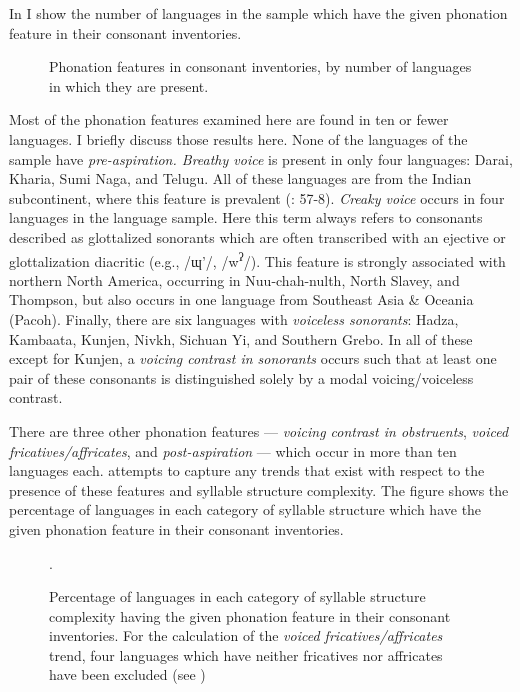   In  I show the number of languages in the sample which have the given phonation feature in their consonant inventories.


\begin{figure}  
\caption{\label{fig:4.4} Phonation features in consonant inventories, by number of languages in which they are present.}
\end{figure}

  Most of the phonation features examined here are found in ten or fewer languages. I briefly discuss those results here. None of the languages of the sample have \textit{pre-aspiration. Breathy voice} is present in only four languages: Darai, Kharia, Sumi Naga, and Telugu. All of these languages are from the Indian subcontinent, where this feature is prevalent (\citealt{LadefogedMaddieson1996}: 57-8). \textit{Creaky voice} occurs in four languages in the language sample. Here this term always refers to consonants described as glottalized sonorants which are often transcribed with an ejective or glottalization diacritic (e.g., /ɰ’/, /w\textsuperscript{ʔ}/). This feature is strongly associated with northern North America, occurring in Nuu-chah-nulth, North Slavey, and Thompson, but also occurs in one language from Southeast Asia \& Oceania (Pacoh). Finally, there are six languages with \textit{voiceless sonorants}: Hadza, Kambaata, Kunjen, Nivkh, Sichuan Yi, and Southern Grebo. In all of these except for Kunjen, a \textit{voicing contrast in sonorants} occurs such that at least one pair of these consonants is distinguished solely by a modal voicing/voiceless contrast.

  There are three other phonation features — \textit{voicing contrast in obstruents}, \textit{voiced fricatives/affricates}, and \textit{post-aspiration} — which occur in more than ten languages each.  attempts to capture any trends that exist with respect to the presence of these features and syllable structure complexity. The figure shows the percentage of languages in each category of syllable structure which have the given phonation feature in their consonant inventories.

\begin{figure}
\caption{\label{fig:4.5} Percentage of languages in each category of syllable structure complexity having the given phonation feature in their consonant inventories. For the calculation of the \textit{voiced fricatives/affricates} trend, four languages which have neither fricatives nor affricates have been excluded (see )}.
\end{figure}

